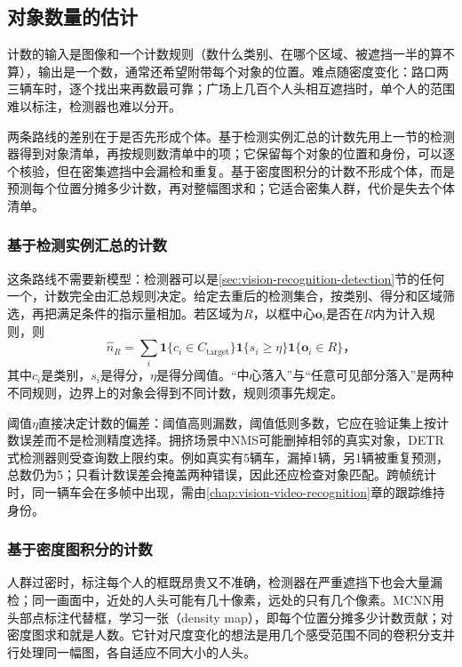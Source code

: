 \subsection{对象数量的估计}
\label{sec:vision-recognition-counting}

计数的输入是图像和一个计数规则（数什么类别、在哪个区域、被遮挡一半的算不算），输出是一个数，通常还希望附带每个对象的位置。难点随密度变化：路口两三辆车时，逐个找出来再数最可靠；广场上几百个人头相互遮挡时，单个人的范围难以标注，检测器也难以分开。

两条路线的差别在于是否先形成个体。基于检测实例汇总的计数先用上一节的检测器得到对象清单，再按规则数清单中的项；它保留每个对象的位置和身份，可以逐个核验，但在密集遮挡中会漏检和重复。基于密度图积分的计数不形成个体，而是预测每个位置分摊多少计数，再对整幅图求和；它适合密集人群，代价是失去个体清单。

\subsubsection{基于检测实例汇总的计数}
\label{sec:vision-recognition-instance-counting}

这条路线不需要新模型：检测器可以是\ref{sec:vision-recognition-detection}节的任何一个，计数完全由汇总规则决定。给定去重后的检测集合，按类别、得分和区域筛选，再把满足条件的指示量相加。若区域为$R$，以框中心$\bm{o}_i$是否在$R$内为计入规则，则
\begin{equation}
 \hat n_R=\sum_i
 \mathbf{1}\{c_i\in C_{\mathrm{target}}\}
 \mathbf{1}\{s_i\geq\eta\}
 \mathbf{1}\{\bm{o}_i\in R\}\text{，}
 \label{eq:vision-detection-count}
\end{equation}
其中$c_i$是类别，$s_i$是得分，$\eta$是得分阈值。“中心落入”与“任意可见部分落入”是两种不同规则，边界上的对象会得到不同计数，规则须事先规定。

阈值$\eta$直接决定计数的偏差：阈值高则漏数，阈值低则多数，它应在验证集上按计数误差而不是检测精度选择。拥挤场景中NMS可能删掉相邻的真实对象，DETR式检测器则受查询数上限约束。例如真实有5辆车，漏掉1辆，另1辆被重复预测，总数仍为5；只看计数误差会掩盖两种错误，因此还应检查对象匹配。跨帧统计时，同一辆车会在多帧中出现，需由\ref{chap:vision-video-recognition}章的跟踪维持身份。

\subsubsection{基于密度图积分的计数}
\label{sec:vision-recognition-mcnn}

人群过密时，标注每个人的框既昂贵又不准确，检测器在严重遮挡下也会大量漏检；同一画面中，近处的人头可能有几十像素，远处的只有几个像素。MCNN用头部点标注代替框，学习一张（density map），即每个位置分摊多少计数贡献；对密度图求和就是人数。它针对尺度变化的想法是用几个感受范围不同的卷积分支并行处理同一幅图，各自适应不同大小的人头。

